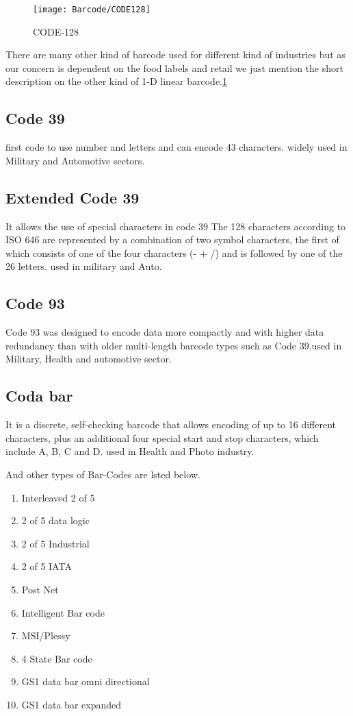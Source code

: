 \begin{figure}
	\begin{center}
		\texttt{[image: Barcode/CODE128]}
		\caption{CODE-128}\label{Code 128}
	\end{center}
\end{figure}

There are many other kind of barcode used for different kind of industries but as our concern is dependent on the food labels and retail we just mention the short description on the other kind of 1-D linear barcode.\ref{Code 128}

\subsection{Code 39}

first code to use number and letters and can encode 43 characters. widely used in Military and Automotive sectors.

\subsection{Extended Code 39}

It allows the use of special characters in code 39 The 128 characters according to ISO 646 are represented by a combination of two symbol characters, the first of which consists of one of the four characters (- + /) and is followed by one of the 26 letters. used in military and Auto.

\subsection{Code 93}

Code 93 was designed to encode data more compactly and with higher data redundancy than with older multi-length barcode types such as Code 39.used in Military, Health and automotive sector.

\subsection{Coda bar}

It is a discrete, self-checking barcode that allows encoding of up to 16 different characters, plus an additional four special start and stop characters, which include A, B, C and D. used in Health and Photo industry.

And other types of Bar-Codes are lsted below.

\begin{enumerate}
	\item Interleaved 2 of 5
	\item 2 of 5 data logic
	\item 2 of 5 Industrial
	\item 2 of 5 IATA
	\item Post Net
	\item Intelligent Bar code
	\item MSI/Plessy
	\item 4 State Bar code
	\item GS1 data bar omni directional
	\item GS1 data bar expanded
\end{enumerate}

